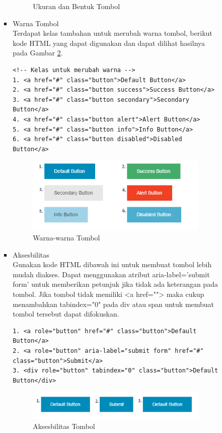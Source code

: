 \begin{itemize}
\begin{itemize}
\begin{enumerate}[(1)]
\begin{itemize}
\begin{figure}[H]
\caption[Ukuran dan Bentuk Tombol]{Ukuran dan Bentuk Tombol}
\label{fig:ukurantombol}
\end{figure}
\item Warna Tombol\\
Terdapat kelas tambahan untuk merubah warna tombol, berikut kode
HTML yang dapat digunakan dan dapat dilihat hasilnya pada Gambar
\ref{fig:warnatombol}.
\begin{lstlisting}[basicstyle=\footnotesize]
<!-- Kelas untuk merubah warna -->
1. <a href="#" class="button">Default Button</a>
2. <a href="#" class="button success">Success Button</a>
3. <a href="#" class="button secondary">Secondary Button</a>
4. <a href="#" class="button alert">Alert Button</a>
5. <a href="#" class="button info">Info Button</a>
6. <a href="#" class="button disabled">Disabled Button</a>
\end{lstlisting}
\begin{figure}[H]
\centering
\includegraphics[scale=1]{Gambar/warnatombol.png}
\caption[Warna-warna Tombol]{Warna-warna Tombol}
\label{fig:warnatombol}
\end{figure}
\item Aksesbilitas\\
Gunakan kode HTML dibawah ini untuk membuat tombol lebih mudah diakses. Dapat
menggunakan atribut aria-label='submit form' untuk memberikan petunjuk jika
tidak ada keterangan pada tombol. Jika tombol tidak memiliki <a href="">
maka cukup menambahkan tabindex="0" pada div atau span untuk membuat tombol
tersebut dapat difokuskan.
\begin{lstlisting}[basicstyle=\footnotesize]
1. <a role="button" href="#" class="button">Default Button</a>
2. <a role="button" aria-label="submit form" href="#" class="button">Submit</a>
3. <div role="button" tabindex="0" class="button">Default Button</div>
\end{lstlisting}
\begin{figure}[H]
\centering
\includegraphics[scale=1]{Gambar/aksesbilitastombol.png}
\caption[Aksesbilitas Tombol]{Aksesbilitas Tombol}
\label{fig:aksesbilitastombol}
\end{figure}
\end{itemize}


\end{enumerate}
\end{itemize}
\end{itemize}
